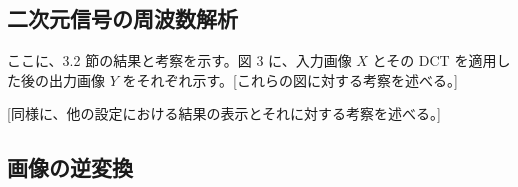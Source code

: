 \documentclass[dvipdfmx]{jsarticle}
\begin{document}


\subsection{二次元信号の周波数解析}

ここに、3.2 節の結果と考察を示す。図 3 に、入力画像 $X$ とその DCT を適用した後の出力画像
$Y$ をそれぞれ示す。[これらの図に対する考察を述べる。]

[同様に、他の設定における結果の表示とそれに対する考察を述べる。]




\subsection{画像の逆変換}
\end{document}
